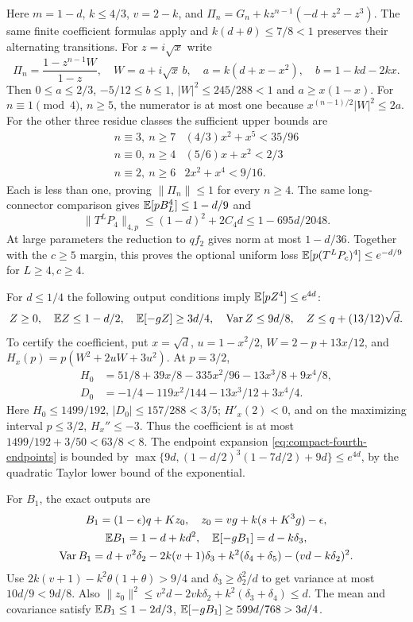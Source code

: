 Here $m=1-d$, $k\le4/3$, $v=2-k$, and
$\Pi_n=G_n+kz^{n-1}(-d+z^2-z^3)$.
The same finite coefficient formulas apply and
$k(d+\theta)\le7/8<1$ preserves their alternating transitions.
For $z=i\sqrt x$ write
\[
 \Pi_n=\frac{1-z^{n-1}W}{1-z},\quad
 W=a+i\sqrt x\,b,\quad a=k(d+x-x^2),\quad b=1-kd-2kx.
\]
Then $0\le a\le2/3$, $-5/12\le b\le1$,
$|W|^2\le245/288<1$ and $a\ge x(1-x)$.
For $n\equiv1\pmod4$, $n\ge5$, the numerator is at most one because
$x^{(n-1)/2}|W|^2\le2a$.
For the other three residue classes the sufficient upper bounds are
\[
 \begin{array}{c|c}
 n\equiv3,\ n\ge7&(4/3)x^2+x^5<35/96\\
 n\equiv0,\ n\ge4&(5/6)x+x^2<2/3\\
 n\equiv2,\ n\ge6&2x^2+x^4<9/16.
 \end{array}
\]
Each is less than one, proving $\|\Pi_n\|\le1$ for every $n\ge4$.
The same long-connector comparison gives $\mathbb E[pB_L^4]\le1-d/9$ and
\[
 \|T^LP_4\|_{4,p}\le(1-d)^2+2C_4d\le1-695d/2048.
\]
At large parameters the reduction to $qf_2$ gives norm at most $1-d/36$.
Together with the $c\ge5$ margin, this proves the optional uniform loss
$\mathbb E[p(T^LP_c)^4]\le e^{-d/9}$ for $L\ge4,c\ge4$.

For $d\le1/4$ the following output conditions imply
$\mathbb E[pZ^4]\le e^{4d}$:
\[
 Z\ge0,\quad \mathbb E Z\le1-d/2,\quad\mathbb E[-gZ]\ge3d/4,\quad
 \operatorname{Var}Z\le9d/8,\quad Z\le q+(13/12)\sqrt d.
\]
To certify the coefficient, put $x=\sqrt d$, $u=1-x^2/2$,
$W=2-p+13x/12$, and $H_x(p)=p(W^2+2uW+3u^2)$.
At $p=3/2$,
\begin{align*}
 H_0&=51/8+39x/8-335x^2/96-13x^3/8+9x^4/8,\\
 D_0&=-1/4-119x^2/144-13x^3/12+3x^4/4.
\end{align*}
Here $H_0\le1499/192$, $|D_0|\le157/288<3/5$;
$H'_x(2)<0$, and on the maximizing interval $p\le3/2$, $H_x''\le-3$.
Thus the coefficient is at most $1499/192+3/50<63/8<8$.
The endpoint expansion \eqref{eq:compact-fourth-endpoints} is bounded by
$\max\{9d,(1-d/2)^3(1-7d/2)+9d\}\le e^{4d}$,
by the quadratic Taylor lower bound of the exponential.

For $B_1$, the exact outputs are
\begin{gather*}
 B_1=(1-\epsilon)q+Kz_0,\quad
 z_0=vg+k(s+K^3g)-\epsilon,\\
 \mathbb E B_1=1-d+kd^2,\quad\mathbb E[-gB_1]=d-k\delta_{3},\\
 \operatorname{Var}B_1=d+v^2\delta_{2}-2k(v+1)\delta_{3}+k^2(\delta_{4}+\delta_{5})-(vd-k\delta_{2})^2.
\end{gather*}
Use $2k(v+1)-k^2\theta(1+\theta)>9/4$ and
$\delta_{3}\ge \delta_{2}^2/d$ to get variance at most $10d/9<9d/8$.
Also $\|z_0\|^2\le v^2d-2vk\delta_{2}+k^2(\delta_{3}+\delta_{4})\le d$.
The mean and covariance satisfy $\mathbb E B_1\le1-2d/3$,
$\mathbb E[-gB_1]\ge599d/768>3d/4$.

